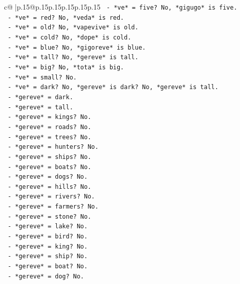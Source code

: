 \documentclass{article}
\begin{document}
{\begin{supertabular}{c@{$\;$}|p{.15\linewidth}@{}p{.15\linewidth}p{.15\linewidth}p{.15\linewidth}p{.15\linewidth}p{.15\linewidth}}
{{{\texttt{            {-} *ve* = five? No, *gigugo* is five.} \\
\texttt{            {-} *ve* = red? No, *veda* is red.} \\
\texttt{            {-} *ve* = old? No, *vapevive* is old.} \\
\texttt{            {-} *ve* = cold? No, *dope* is cold.} \\
\texttt{            {-} *ve* = blue? No, *gigoreve* is blue.} \\
\texttt{            {-} *ve* = tall? No, *gereve* is tall.} \\
\texttt{            {-} *ve* = big? No, *tota* is big.} \\
\texttt{            {-} *ve* = small? No.} \\
\texttt{            {-} *ve* = dark? No, *gereve* is dark? No, *gereve* is tall.} \\
\texttt{            {-} *gereve* = dark.} \\
\texttt{            {-} *gereve* = tall.} \\
\texttt{            {-} *gereve* = kings? No.} \\
\texttt{            {-} *gereve* = roads? No.} \\
\texttt{            {-} *gereve* = trees? No.} \\
\texttt{            {-} *gereve* = hunters? No.} \\
\texttt{            {-} *gereve* = ships? No.} \\
\texttt{            {-} *gereve* = boats? No.} \\
\texttt{            {-} *gereve* = dogs? No.} \\
\texttt{            {-} *gereve* = hills? No.} \\
\texttt{            {-} *gereve* = rivers? No.} \\
\texttt{            {-} *gereve* = farmers? No.} \\
\texttt{            {-} *gereve* = stone? No.} \\
\texttt{            {-} *gereve* = lake? No.} \\
\texttt{            {-} *gereve* = bird? No.} \\
\texttt{            {-} *gereve* = king? No.} \\
\texttt{            {-} *gereve* = ship? No.} \\
\texttt{            {-} *gereve* = boat? No.} \\
\texttt{            {-} *gereve* = dog? No.} \\
}}}
\end{supertabular}}
\end{document}
